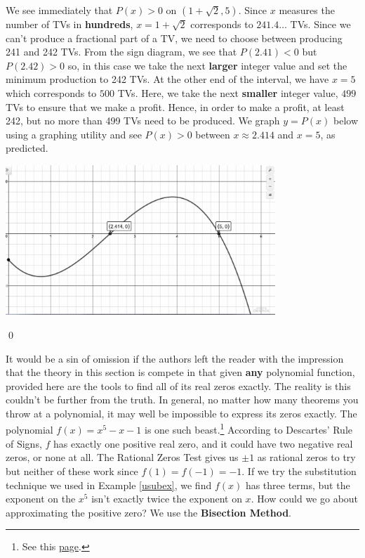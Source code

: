 \documentclass{ximera}
\begin{document}
\begin{example}
We see immediately that $P(x)>0$ on $(1+\sqrt{2},5)$.  Since $x$ measures the number of TVs in \textbf{hundreds}, $x = 1 + \sqrt{2}$ corresponds to $241.4\ldots$ TVs.  Since we can't produce a fractional part of a TV, we need to choose between producing 241 and 242 TVs.  From the sign diagram, we see that $P(2.41) < 0$ but $P(2.42)>0$ so, in this case we take the next \textbf{larger} integer value and set the minimum production to 242 TVs.  At the other end of the interval, we have $x=5$ which corresponds to $500$ TVs.  Here, we take the next \textbf{smaller} integer value, $499$ TVs to ensure that we make a profit.  Hence, in order to make a profit, at least 242, but no more than 499 TVs need to be produced.  We graph $y = P(x)$ below using a graphing utility and see $P(x) > 0$ between $x \approx 2.414$ and $x = 5$, as predicted.
\begin{center}

\includegraphics[width = 4in]{./RealZerosGraphics/RealZerosEx04.jpg}

\end{center}  

 \qed

\end{example}


It would be a sin of omission if the authors left the reader with the impression that the theory in this section is compete in that given \textbf{any} polynomial function, provided here are the tools to find all of its real zeros exactly.  The reality is this couldn't be further from the truth.  In general, no matter how many theorems you throw at a polynomial, it may well be impossible to express its zeros exactly.  The polynomial $f(x) = x^5-x-1$ is one such beast.\footnote{See this \href{http://en.wikipedia.org/wiki/Galois_theory}{\underline{page}}.}  According to Descartes' Rule of Signs, $f$ has exactly one positive real zero, and it could have two negative real zeros, or none at all.  The Rational Zeros Test gives us $\pm 1$ as rational zeros to try but neither of these work since $f(1) = f(-1) = -1$.  If we try the substitution technique we used in Example \ref{usubex}, we find $f(x)$ has three terms, but the exponent on the $x^5$ isn't exactly twice the exponent on $x$.  How could we go about approximating the positive zero?   We use the  \textbf{Bisection Method}.  
\end{document}
